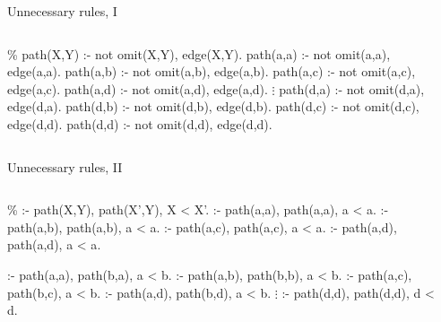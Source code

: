 \begin{frame}[fragile]{Unnecessary rules, I}
  \vfill
  \begin{columns}
    \begin{column}{0.6\textwidth}
      \begin{minipage}{0.6\textwidth}
      \begin{semiverbatim}
{\color{comment}\% path(X,Y) :- not omit(X,Y), edge(X,Y).}
path(a,a) :- not omit(a,a), \alert{edge(a,a)}.
path(a,b) :- not omit(a,b), edge(a,b).
path(a,c) :- not omit(a,c), edge(a,c).
path(a,d) :- not omit(a,d), \alert{edge(a,d)}.
          \(\vdots\)
path(d,a) :- not omit(d,a), edge(d,a).
path(d,b) :- not omit(d,b), \alert{edge(d,b).}
path(d,c) :- not omit(d,c), \alert{edge(d,d).}
path(d,d) :- not omit(d,d), \alert{edge(d,d).}


      \end{semiverbatim}
    \end{minipage}
    \end{column}
    \begin{column}{0.25\textwidth}
      \Graph
    \end{column}
  \end{columns}
\end{frame}
\begin{frame}[fragile]{Unnecessary rules, II}
  \vfill
  \begin{columns}
    \begin{column}{0.6\textwidth}
      \begin{minipage}{0.6\textwidth}
      \begin{semiverbatim}
{\color{comment}\% :- path(X,Y), path(X',Y), X < X'.}
:- \alert{path(a,a)}, \alert{path(a,a)}, \alert{a < a}.
:- path(a,b), path(a,b), \alert{a < a}.
:- path(a,c), path(a,c), \alert{a < a}.
:- \alert{path(a,d)}, \alert{path(a,d)}, \alert{a < a}.

:- \alert{path(a,a)}, \alert{path(b,a)}, a < b.
:- path(a,b), \alert{path(b,b)}, a < b.
:- path(a,c), path(b,c), a < b.
:- \alert{path(a,d)}, path(b,d), a < b.
          \(\vdots\)
:- \alert{path(d,d)}, \alert{path(d,d)}, \alert{d < d}.
      \end{semiverbatim}
    \end{minipage}
    \end{column}
    \begin{column}{0.25\textwidth}
      \Graph
    \end{column}
  \end{columns}
\end{frame}
%
